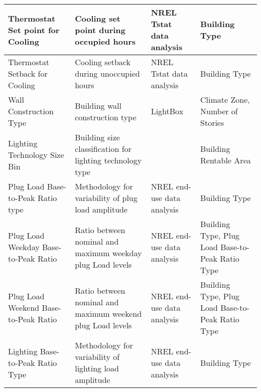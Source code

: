 \begin{center}
\begin{longtable}{|p{1.3in}|p{1.5in}|p{1.5in}|p{1.5in}|}
Thermostat Set point for Cooling                                 & Cooling set point during occupied hours                                         & NREL Tstat data analysis                                    & Building Type                                                                                        \\ \hline
Thermostat Setback for Cooling                                  & Cooling setback during unoccupied hours                                        & NREL Tstat data analysis                                    & Building Type                                                                                        \\ \hline
Wall Construction Type                                          & Building wall construction type                                                & LightBox                                                    & Climate Zone, Number of Stories                                                                      \\ \hline
Lighting Technology Size Bin                                    & Building size classification for lighting technology type                      &                                                             & Building Rentable Area                                                                               \\ \hline
Plug Load Base-to-Peak Ratio type                                & Methodology for variability of plug load amplitude                              & NREL end-use data analysis                                  & Building Type                                                                                        \\ \hline
Plug Load Weekday Base-to-Peak Ratio                             & Ratio between nominal and maximum weekday plug Load levels                      & NREL end-use data analysis                                  & Building Type, Plug Load Base-to-Peak Ratio Type                                                      \\ \hline
Plug Load Weekend Base-to-Peak Ratio                             & Ratio between nominal and maximum weekend plug Load levels                      & NREL end-use data analysis                                  & Building Type, Plug Load Base-to-Peak Ratio Type                                                      \\ \hline
Lighting Base-to-Peak Ratio Type                                & Methodology for variability of lighting load amplitude                         & NREL end-use data analysis                                  & Building Type                                                                                        \\ \hline

\end{longtable}
\end{center}

